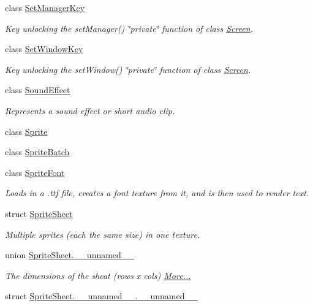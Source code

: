 \begin{DoxyCompactItemize}
class \hyperlink{classnta_1_1SetManagerKey}{Set\+Manager\+Key}
\begin{DoxyCompactList}\small\item\em Key unlocking the set\+Manager() \char`\"{}private\char`\"{} function of class \hyperlink{classnta_1_1Screen}{Screen}. \end{DoxyCompactList}\item 
class \hyperlink{classnta_1_1SetWindowKey}{Set\+Window\+Key}
\begin{DoxyCompactList}\small\item\em Key unlocking the set\+Window() \char`\"{}private\char`\"{} function of class \hyperlink{classnta_1_1Screen}{Screen}. \end{DoxyCompactList}\item 
class \hyperlink{classnta_1_1SoundEffect}{Sound\+Effect}
\begin{DoxyCompactList}\small\item\em Represents a sound effect or short audio clip. \end{DoxyCompactList}\item 
class \hyperlink{classnta_1_1Sprite}{Sprite}
\item 
class \hyperlink{classnta_1_1SpriteBatch}{Sprite\+Batch}
\item 
class \hyperlink{classnta_1_1SpriteFont}{Sprite\+Font}
\begin{DoxyCompactList}\small\item\em Loads in a .ttf file, creates a font texture from it, and is then used to render text. \end{DoxyCompactList}\item 
struct \hyperlink{structnta_1_1SpriteSheet}{Sprite\+Sheet}
\begin{DoxyCompactList}\small\item\em Multiple sprites (each the same size) in one texture. \end{DoxyCompactList}\item 
union \hyperlink{namespacenta_d1/d70/unionnta_1_1SpriteSheet_8____unnamed____}{Sprite\+Sheet.\+\_\+\+\_\+unnamed\+\_\+\+\_\+}
\begin{DoxyCompactList}\small\item\em The dimensions of the sheat (rows x cols)  \hyperlink{namespacenta_d1/d70/unionnta_1_1SpriteSheet_8____unnamed____}{More...}\end{DoxyCompactList}\item 
struct \hyperlink{namespacenta_df/d10/structnta_1_1SpriteSheet_8____unnamed_____8____unnamed____}{Sprite\+Sheet.\+\_\+\+\_\+unnamed\+\_\+\+\_\+.\+\_\+\+\_\+unnamed\+\_\+\+\_\+}

\end{DoxyCompactItemize}
